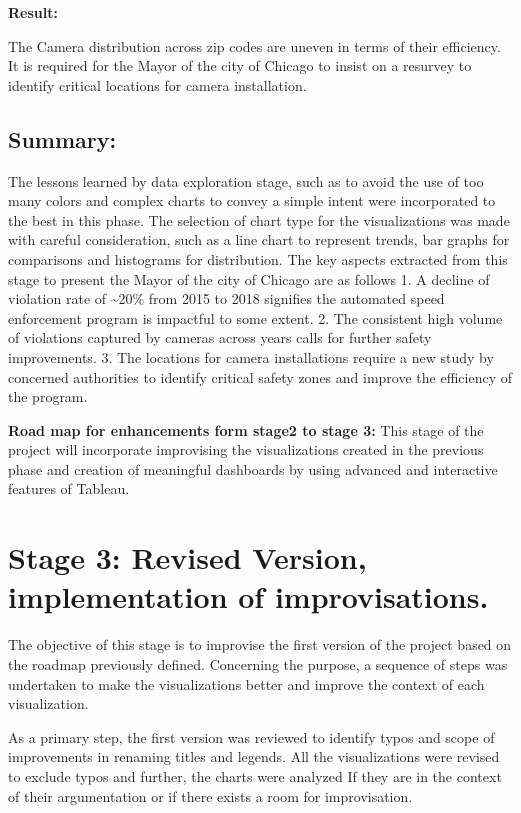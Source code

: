 \documentclass[]{book}
\begin{document}
\textbf{Result:}

The Camera distribution across zip codes are uneven in terms of their efficiency. It is required for the Mayor of the city of Chicago to insist on a resurvey to identify critical locations for camera installation.

\hypertarget{summary}{%
\section{Summary:}\label{summary}}

The lessons learned by data exploration stage, such as to avoid the use of too many colors and complex charts to convey a simple intent were incorporated to the best in this phase. The selection of chart type for the visualizations was made with careful consideration, such as a line chart to represent trends, bar graphs for comparisons and histograms for distribution.
The key aspects extracted from this stage to present the Mayor of the city of Chicago are as follows
1. A decline of violation rate of \textasciitilde{}20\% from 2015 to 2018 signifies the automated speed enforcement program is impactful to some extent.
2. The consistent high volume of violations captured by cameras across years calls for further safety improvements.
3. The locations for camera installations require a new study by concerned authorities to identify critical safety zones and improve the efficiency of the program.

\textbf{Road map for enhancements form stage2 to stage 3:}
This stage of the project will incorporate improvising the visualizations created in the previous phase and creation of meaningful dashboards by using advanced and interactive features of Tableau.

\hypertarget{stage-3-revised-version-implementation-of-improvisations.}{%
\chapter{Stage 3: Revised Version, implementation of improvisations.}\label{stage-3-revised-version-implementation-of-improvisations.}}

The objective of this stage is to improvise the first version of the project based on the roadmap previously defined. Concerning the purpose, a sequence of steps was undertaken to make the visualizations better and improve the context of each visualization.

As a primary step, the first version was reviewed to identify typos and scope of improvements in renaming titles and legends. All the visualizations were revised to exclude typos and further, the charts were analyzed If they are in the context of their argumentation or if there exists a room for improvisation.
\end{document}
